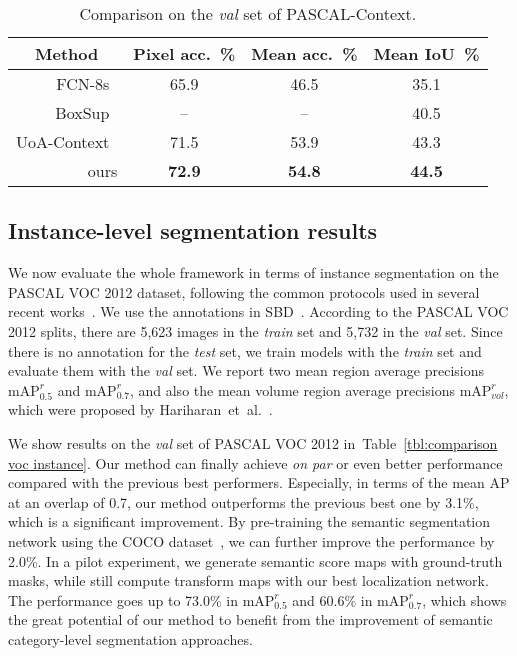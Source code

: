 \documentclass{article}
\begin{document}
\begin{table}[t]
\caption{Comparison on the \emph{val} set of PASCAL-Context.}
\label{tbl:comparison pascal-context}
\centering
\resizebox{0.7\textwidth}{!}
{
\begin{tabular}{r|c|c|c}
\toprule
\multicolumn{1}{c|}{Method} & Pixel acc.~\% & Mean acc.~\% & Mean IoU~\% \\
\hline
FCN-8s~\cite{FCN.CVPR.2015.Long} & 65.9 & 46.5 & 35.1 \\
BoxSup~\cite{BoxSup.ICCV.2015.Dai} & -- & -- & 40.5 \\
UoA-Context~\cite{AdelaideContext.2016.Lin} & 71.5 & 53.9 & 43.3 \\
\hline\
ours & \textbf{72.9} & \textbf{54.8} & \textbf{44.5} \\
\bottomrule
\end{tabular}
}
\end{table}













\subsection{Instance-level segmentation results}
We now evaluate the whole framework in terms of instance segmentation on the PASCAL VOC 2012 dataset, following the common protocols used in several recent works~\cite{SDS.ECCV.2014.Hariharan,HyperColumn.CVPR.2015.Hariharan,MNC.CVPR.2016.Dai}.
We use the annotations in SBD~\cite{SBD.ICCV.2011.Hariharan}.
According to the PASCAL VOC 2012 splits, there are 5,623 images in the \emph{train} set and 5,732 in the \emph{val} set.
Since there is no annotation for the \emph{test} set, we train models with the \emph{train} set and evaluate them with the \emph{val} set.
We report two mean region average precisions $\textrm{mAP}^{r}_{0.5}$ and $\textrm{mAP}^{r}_{0.7}$,
and also the mean volume region average precisions $\textrm{mAP}^{r}_{vol}$,
which were proposed by Hariharan~et~al.~\cite{SDS.ECCV.2014.Hariharan}.



We show results on the \emph{val} set of PASCAL VOC 2012 in~Table~\ref{tbl:comparison voc instance}.
Our method can finally achieve \emph{on par} or even better performance compared with the previous best performers.
Especially, in terms of the mean AP at an overlap of 0.7, our method outperforms the previous best one by 3.1\%, which is a significant improvement.
By pre-training the semantic segmentation network using the COCO dataset~\cite{COCO.ECCV.2014.Lin},
we can further improve the performance by 2.0\%.
In a pilot experiment, we generate semantic score maps with ground-truth masks,
while still compute transform maps with our best localization network.
The performance goes up to 73.0\% in $\textrm{mAP}^{r}_{0.5}$ and 60.6\% in $\textrm{mAP}^{r}_{0.7}$,
which shows the great potential of our method to benefit from the improvement of semantic category-level segmentation approaches.
\end{document}
